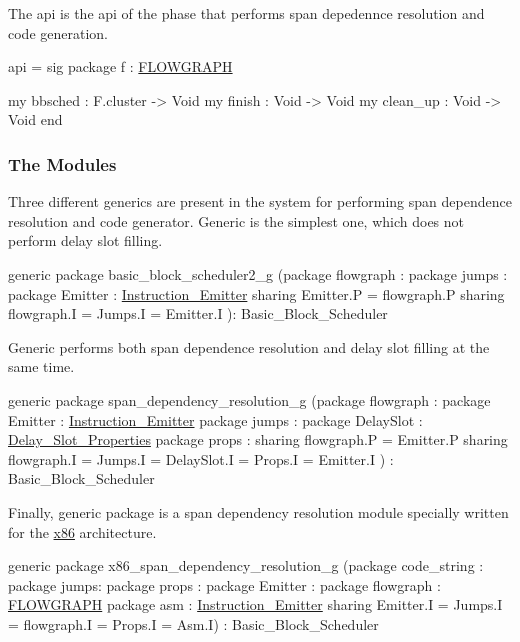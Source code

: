 The api  is the api of the phase that performs
span depedennce resolution and code generation.
\begin{SML}
api  = sig
  package f : \href{cluster.html}{FLOWGRAPH}

  my bbsched : F.cluster -> Void
  my finish : Void -> Void
  my clean_up : Void -> Void
end
\end{SML}

\subsubsection{The Modules}

Three different generics are present in the \MLRISC{} system for
performing span dependence resolution and code generator.
Generic  is the simplest one, which does not perform
delay slot filling.
\begin{SML}
generic package basic_block_scheduler2_g
  (package flowgraph : 
   package jumps : 
   package Emitter : \href{mc.html}{Instruction_Emitter}
     sharing Emitter.P = flowgraph.P
     sharing flowgraph.I = Jumps.I = Emitter.I
  ): Basic_Block_Scheduler 
\end{SML}

Generic  performs both span dependence
resolution and delay slot filling at the same time.
\begin{SML}
generic package span_dependency_resolution_g
  (package flowgraph : 
   package Emitter : \href{mc.html}{Instruction_Emitter}
   package jumps : 
   package DelaySlot : \href{delayslots.html}{Delay_Slot_Properties}
   package props : 
     sharing flowgraph.P = Emitter.P
     sharing flowgraph.I = Jumps.I = DelaySlot.I = Props.I = Emitter.I
  ) : Basic_Block_Scheduler 
\end{SML}

Finally, generic package  is a span dependency resolution
module specially written for the \href{x86.html}{x86} architecture.
\begin{SML}
generic package x86_span_dependency_resolution_g
  (package code_string : 
   package jumps: 
   package props : 
   package Emitter : 
   package flowgraph : \href{cluster.html}{FLOWGRAPH}
   package asm : \href{asm.html}{Instruction_Emitter}
      sharing Emitter.I = Jumps.I = flowgraph.I = Props.I = Asm.I) : Basic_Block_Scheduler 
\end{SML}


